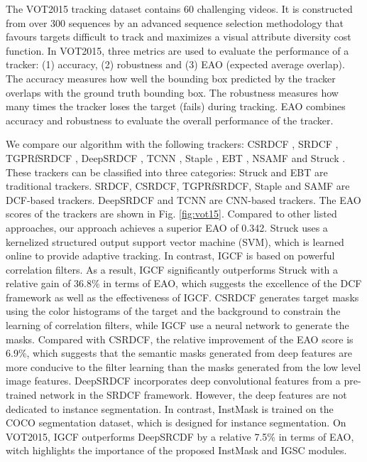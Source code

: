 The VOT2015 \cite{Kristan2015TheVO} tracking dataset contains 60 challenging videos. It is constructed from over 300 sequences by an advanced sequence selection methodology that favours targets difficult to track and maximizes a visual attribute diversity cost function. 
In VOT2015, three metrics are used to evaluate the performance of a tracker: (1) accuracy, (2) robustness and (3) EAO (expected average overlap). The accuracy measures how well the bounding box predicted by the tracker overlaps with the ground truth bounding box. The robustness measures how many times the tracker loses the target (fails) during tracking. EAO combines accuracy and robustness to evaluate the overall performance of the tracker. 

We compare our algorithm with the following trackers: CSRDCF \cite{Lukezic2017DiscriminativeCF}, SRDCF \cite{Danelljan2015LearningSR}, TGPRfSRDCF \cite{gao2018tracking}, DeepSRDCF \cite{Danelljan2015ConvolutionalFF}, TCNN \cite{nam2016modeling}, Staple \cite{Bertinetto2016StapleC}, EBT \cite{Zhu2016BeyondLS}, NSAMF \cite{Hua2015OnlineOT} and Struck \cite{Hare2011StruckSO}.
These trackers can be classified into three categories: Struck and EBT are traditional trackers. SRDCF, CSRDCF, TGPRfSRDCF, Staple and SAMF are DCF-based trackers. DeepSRDCF and TCNN are CNN-based trackers.
The EAO scores of the trackers are shown in Fig. \ref{fig:vot15}. Compared to other listed approaches, our approach achieves a superior EAO of 0.342. 
Struck uses a kernelized structured output support vector machine (SVM), which is learned online to provide adaptive tracking. In contrast, IGCF is based on powerful correlation filters. As a result, IGCF significantly outperforms Struck with a relative gain of 36.8\% in terms of EAO, which suggests the excellence of the DCF framework as well as the effectiveness of IGCF.
CSRDCF generates target masks using the color histograms of the target and the background to constrain the learning of correlation filters, while IGCF use a neural network to generate the masks. Compared with CSRDCF, the relative improvement of the EAO score is 6.9\%, which suggests that the semantic masks generated from deep features are more conducive to the filter learning than the masks generated from the low level image features.
DeepSRDCF incorporates deep convolutional features from a pre-trained network in the SRDCF framework. However, the deep features are not dedicated to instance segmentation. In contrast, InstMask is trained on the COCO segmentation dataset, which is designed for instance segmentation. On VOT2015, IGCF outperforms DeepSRCDF by a relative 7.5\% in terms of EAO, witch highlights the importance of the proposed InstMask and IGSC modules.

